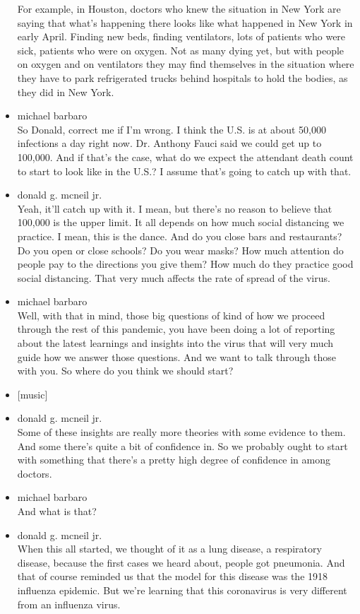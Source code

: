 \begin{itemize}
  For example, in Houston, doctors who knew the situation in New York
  are saying that what's happening there looks like what happened in New
  York in early April. Finding new beds, finding ventilators, lots of
  patients who were sick, patients who were on oxygen. Not as many dying
  yet, but with people on oxygen and on ventilators they may find
  themselves in the situation where they have to park refrigerated
  trucks behind hospitals to hold the bodies, as they did in New York.
\item
  michael barbaro\\
  So Donald, correct me if I'm wrong. I think the U.S. is at about
  50,000 infections a day right now. Dr. Anthony Fauci said we could get
  up to 100,000. And if that's the case, what do we expect the attendant
  death count to start to look like in the U.S.? I assume that's going
  to catch up with that.
\item
  donald g. mcneil jr.\\
  Yeah, it'll catch up with it. I mean, but there's no reason to believe
  that 100,000 is the upper limit. It all depends on how much social
  distancing we practice. I mean, this is the dance. And do you close
  bars and restaurants? Do you open or close schools? Do you wear masks?
  How much attention do people pay to the directions you give them? How
  much do they practice good social distancing. That very much affects
  the rate of spread of the virus.
\item
  michael barbaro\\
  Well, with that in mind, those big questions of kind of how we proceed
  through the rest of this pandemic, you have been doing a lot of
  reporting about the latest learnings and insights into the virus that
  will very much guide how we answer those questions. And we want to
  talk through those with you. So where do you think we should start?
\item
  {[}music{]}
\item
  donald g. mcneil jr.\\
  Some of these insights are really more theories with some evidence to
  them. And some there's quite a bit of confidence in. So we probably
  ought to start with something that there's a pretty high degree of
  confidence in among doctors.
\item
  michael barbaro\\
  And what is that?
\item
  donald g. mcneil jr.\\
  When this all started, we thought of it as a lung disease, a
  respiratory disease, because the first cases we heard about, people
  got pneumonia. And that of course reminded us that the model for this
  disease was the 1918 influenza epidemic. But we're learning that this
  coronavirus is very different from an influenza virus.


\end{itemize}
